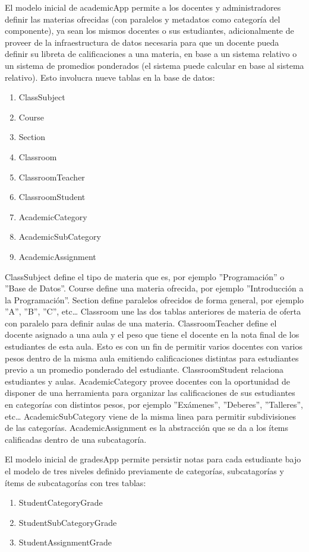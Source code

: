 El modelo inicial de academicApp permite a los docentes y administradores definir las materias ofrecidas (con paralelos y metadatos como categoría del componente), ya sean los mismos docentes o sus estudiantes, adicionalmente de proveer de la infraestructura de datos necesaria para que un docente pueda definir su libreta de calificaciones a una materia, en base a un sistema relativo o un sistema de promedios ponderados (el sistema puede calcular en base al sistema relativo). Esto involucra nueve tablas en la base de datos:
\begin{enumerate}
  \item ClassSubject
  \item Course
  \item Section
  \item Classroom
  \item ClassroomTeacher
  \item ClassroomStudent
  \item AcademicCategory
  \item AcademicSubCategory
  \item AcademicAssignment
\end{enumerate}
ClassSubject define el tipo de materia que es, por ejemplo ''Programación'' o ''Base de Datos''. Course define una materia ofrecida, por ejemplo ''Introducción a la Programación''. Section define paralelos ofrecidos de forma general, por ejemplo ''A'', ''B'', ''C'', etc\ldots{} Classroom une las dos tablas anteriores de materia de oferta con paralelo para definir aulas de una materia. ClassroomTeacher define el docente asignado a una aula y el peso que tiene el docente en la nota final de los estudiantes de esta aula. Esto es con un fin de permitir varios docentes con varios pesos dentro de la misma aula emitiendo calificaciones distintas para estudiantes previo a un promedio ponderado del estudiante. ClassroomStudent relaciona estudiantes y aulas. AcademicCategory provee docentes con la oportunidad de disponer de una herramienta para organizar las calificaciones de sus estudiantes en categorías con distintos pesos, por ejemplo ''Exámenes'', ''Deberes'', ''Talleres'', etc\ldots{} AcademicSubCategory viene de la misma linea para permitir subdivisiones de las categorías. AcademicAssignment es la abstracción que se da a los ítems calificadas dentro de una subcatagoría.

El modelo inicial de gradesApp permite persistir notas para cada estudiante bajo el modelo de tres niveles definido previamente de categorías, subcatagorías y ítems de subcatagorías con tres tablas:
\begin{enumerate}
  \item StudentCategoryGrade
  \item StudentSubCategoryGrade
  \item StudentAssignmentGrade
\end{enumerate}

